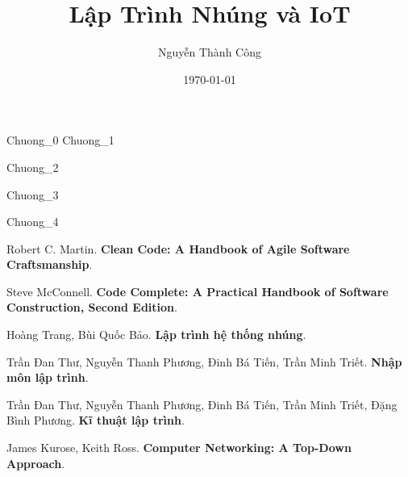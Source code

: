 \documentclass[12pt,a4paper]{book}
\title{Lập Trình Nhúng và IoT}
\date{\today}
\author{Nguyễn Thành Công}
\begin{document}
\graphicspath{{./Vietnamese/Images/}}
\maketitle
 {Chuong_0}
\tableofcontents
  {Chuong_1}

  {Chuong_2}

  {Chuong_3}

 {Chuong_4}

\begin{thebibliography}{9}
Robert C. Martin. 
\textbf{Clean Code: A Handbook of Agile Software Craftsmanship}. 
 
Steve McConnell.
\textbf{Code Complete: A Practical Handbook of Software Construction, Second Edition}.

Hoàng Trang, Bùi Quốc Bảo.
\textbf{Lập trình hệ thống nhúng}.

Trần Đan Thư, Nguyễn Thanh Phương, Đinh Bá Tiến, Trần Minh Triết.
\textbf{Nhập môn lập trình}.

Trần Đan Thư, Nguyễn Thanh Phương, Đinh Bá Tiến, Trần Minh Triết, Đặng Bình Phương.
\textbf{Kĩ thuật lập trình}.

James Kurose, Keith Ross.
\textbf{Computer Networking: A Top-Down Approach}.

\end{thebibliography}
\end{document}
